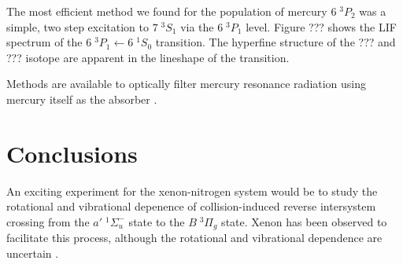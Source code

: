 \documentclass[12pt]{mitthesis}
\begin{document}
The most efficient method we found for the population of mercury $6 \;
^3P_2$ was a simple, two step excitation to $7 \; ^3S_1$ via the $6 \;
^3P_1$ level.  Figure ??? shows the LIF spectrum of the $6 \; ^3P_1
\leftarrow 6\;^1S_0$ transition.  The hyperfine structure of the ???
and ??? isotope are apparent in the lineshape of the transition.

Methods are available to optically filter mercury resonance radiation
using mercury itself as the absorber \cite{vanzee89, senitzky74}.

\section{Conclusions}

An exciting experiment for the xenon-nitrogen system would be to study
the rotational and vibrational depenence of collision-induced reverse
intersystem crossing from the $a' \; ^1\Sigma_u^-$ state to the $B \;
^3\Pi_g$ state.  Xenon has been observed to facilitate this process,
although the rotational and vibrational dependence are uncertain
\cite{umemoto03a}.

 

\end{document}
